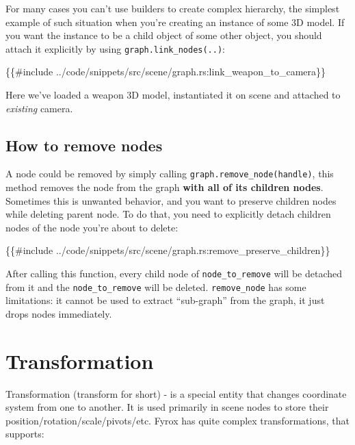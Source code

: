 \documentclass[
]{book}
\newenvironment{Shaded}{\begin{snugshade}}{\end{snugshade}}
\newcommand{\NormalTok}[1]{#1}
\theoremstyle{definition}
\theoremstyle{definition}
\theoremstyle{definition}
\theoremstyle{definition}
\theoremstyle{remark}
\begin{document}
For many cases you can't use builders to create complex hierarchy, the simplest example of such situation when you're creating an instance of some 3D model. If you want the instance to be a child object of some other object, you should attach it explicitly by using \texttt{graph.link\_nodes(..)}:

\begin{Shaded}
\begin{Highlighting}[]
\NormalTok{\{\{\#include ../code/snippets/src/scene/graph.rs:link\_weapon\_to\_camera\}\}}
\end{Highlighting}
\end{Shaded}

Here we've loaded a weapon 3D model, instantiated it on scene and attached to \emph{existing} camera.

\subsection{How to remove nodes}\label{how-to-remove-nodes}

A node could be removed by simply calling \texttt{graph.remove\_node(handle)}, this method removes the node from the graph \textbf{with all of its children nodes}. Sometimes this is unwanted behavior, and you want to preserve children nodes while deleting parent node. To do that, you need to explicitly detach children nodes of the node you're about to delete:

\begin{Shaded}
\begin{Highlighting}[]
\NormalTok{\{\{\#include ../code/snippets/src/scene/graph.rs:remove\_preserve\_children\}\}}
\end{Highlighting}
\end{Shaded}

After calling this function, every child node of \texttt{node\_to\_remove} will be detached from it and the \texttt{node\_to\_remove} will be deleted. \texttt{remove\_node} has some limitations: it cannot be used to extract ``sub-graph'' from the graph, it just drops nodes immediately.

\section{Transformation}\label{transformation}

Transformation (transform for short) - is a special entity that changes coordinate system from one to another. It is used primarily in scene nodes to store their position/rotation/scale/pivots/etc. Fyrox has quite complex transformations, that supports:
\end{document}
